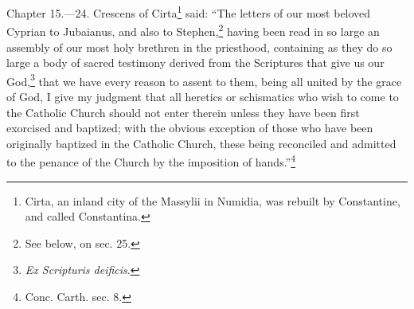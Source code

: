 
Chapter 15.—24. Crescens of Cirta\footnote{\par  Cirta, an inland city of the Massylii in Numidia, was rebuilt by Constantine, and called Constantina.} said: ``The letters of our most beloved Cyprian to Jubaianus, and also to Stephen,\footnote{\par  See below, on sec. 25.} having been read in so large an assembly of our most holy brethren in the priesthood, containing as they do so large a body of sacred testimony derived from the Scriptures that give us our God,\footnote{\par  \emph{Ex Scripturis deificis}.} that we have every reason to assent to them, being all united by the grace of God, I give my judgment that all heretics or schismatics who wish to come to the Catholic Church should not enter therein unless they have been first exorcised and baptized; with the obvious exception of those who have been originally baptized in the Catholic Church, these being reconciled and admitted to the penance of the Church by the imposition of hands.''\footnote{\par  Conc. Carth. sec. 8.}

